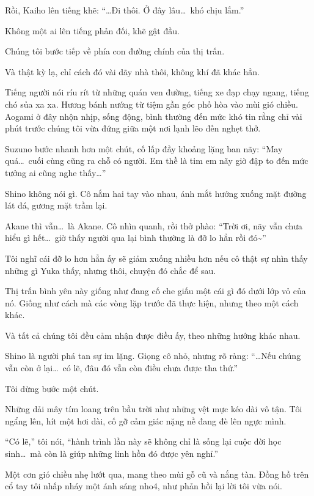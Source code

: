 \documentclass[../main.tex]{subfiles}
\begin{document}
Rồi, Kaiho lên tiếng khẽ: ``\dots Đi thôi. Ở đây lâu\dots\ khó chịu lắm.''

Không một ai lên tiếng phản đối, khẽ gật đầu.

Chúng tôi bước tiếp về phía con đường chính của thị trấn.

Và thật kỳ lạ, chỉ cách đó vài dãy nhà thôi, không khí đã khác hẳn.

Tiếng người nói ríu rít từ những quán ven đường, tiếng xe đạp chạy ngang, tiếng chó sủa xa xa. Hương bánh nướng từ tiệm gần góc phố hòa vào mùi gió chiều. Aogami ở đây nhộn nhịp, sống động, bình thường đến mức khó tin rằng chỉ vài phút trước chúng tôi vừa đứng giữa một nơi lạnh lẽo đến nghẹt thở.

Suzuno bước nhanh hơn một chút, cố lấp đầy khoảng lặng ban nãy: ``May quá\dots\ cuối cùng cũng ra chỗ có người. Em thề là tim em nãy giờ đập to đến mức tưởng ai cũng nghe thấy\dots''

Shino không nói gì. Cô nắm hai tay vào nhau, ánh mắt hướng xuống mặt đường lát đá, gương mặt trầm lại.

Akane thì vẫn\dots\ là Akane. Cô nhìn quanh, rồi thở phào: ``Trời ơi, nãy vẫn chưa hiểu gì hết\dots\ giờ thấy người qua lại bình thường là đỡ lo hẳn rồi đó\~{}''

Tôi nghĩ cái đỡ lo hơn hẳn ấy sẽ giảm xuống nhiều hơn nếu cô thật sự nhìn thấy những gì Yuka thấy, nhưng thôi, chuyện đó chắc để sau.

Thị trấn bình yên này giống như đang cố che giấu một cái gì đó dưới lớp vỏ của nó. Giống như cách mà các vòng lặp trước đã thực hiện, nhưng theo một cách khác.

Và tất cả chúng tôi đều cảm nhận được điều ấy, theo những hướng khác nhau.

Shino là người phá tan sự im lặng. Giọng cô nhỏ, nhưng rõ ràng: ``\dots Nếu chúng vẫn còn ở lại\dots\ có lẽ, đâu đó vẫn còn điều chưa được tha thứ.''

Tôi dừng bước một chút.

Những dải mây tím loang trên bầu trời như những vệt mực kéo dài vô tận. Tôi ngẩng lên, hít một hơi dài, cố gỡ cảm giác nặng nề đang đè lên ngực mình.

``Có lẽ,'' tôi nói, ``hành trình lần này sẽ không chỉ là sống lại cuộc đời học sinh\dots\ mà còn là giúp những linh hồn đó được yên nghỉ.''

Một cơn gió chiều nhẹ lướt qua, mang theo mùi gỗ cũ và nắng tàn. Đồng hồ trên cổ tay tôi nhấp nháy một ánh sáng nho4, như phản hồi lại lời tôi vừa nói.
\end{document}
